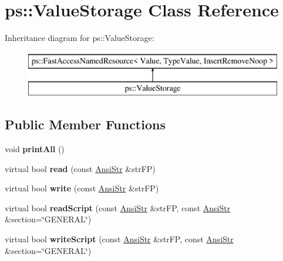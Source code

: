 \hypertarget{classps_1_1ValueStorage}{}\section{ps\+:\+:Value\+Storage Class Reference}
\label{classps_1_1ValueStorage}
Inheritance diagram for ps\+:\+:Value\+Storage\+:\begin{figure}[H]
\begin{center}
\leavevmode
\includegraphics[height=2.000000cm]{classps_1_1ValueStorage}
\end{center}
\end{figure}
\subsection*{Public Member Functions}
\begin{DoxyCompactItemize}
\item 
\hypertarget{classps_1_1ValueStorage_a683e7c7eaf6eb51811ba3b6dcbfeaad8}{}void {\bfseries print\+All} ()\label{classps_1_1ValueStorage_a683e7c7eaf6eb51811ba3b6dcbfeaad8}

\item 
\hypertarget{classps_1_1ValueStorage_ae1dc01f5d76d1d1f037e1ca330f3b8d8}{}virtual bool {\bfseries read} (const \hyperlink{classps_1_1base_1_1CAString}{Ansi\+Str} \&str\+F\+P)\label{classps_1_1ValueStorage_ae1dc01f5d76d1d1f037e1ca330f3b8d8}

\item 
\hypertarget{classps_1_1ValueStorage_a95a94b2b4bbed02ab26185ae1ba8f926}{}virtual bool {\bfseries write} (const \hyperlink{classps_1_1base_1_1CAString}{Ansi\+Str} \&str\+F\+P)\label{classps_1_1ValueStorage_a95a94b2b4bbed02ab26185ae1ba8f926}

\item 
\hypertarget{classps_1_1ValueStorage_a43014a4a189cda8ef9498edfe19993a8}{}virtual bool {\bfseries read\+Script} (const \hyperlink{classps_1_1base_1_1CAString}{Ansi\+Str} \&str\+F\+P, const \hyperlink{classps_1_1base_1_1CAString}{Ansi\+Str} \&section=\char`\"{}G\+E\+N\+E\+R\+A\+L\char`\"{})\label{classps_1_1ValueStorage_a43014a4a189cda8ef9498edfe19993a8}

\item 
\hypertarget{classps_1_1ValueStorage_a0d002ab47d51649919643afcc16b7f61}{}virtual bool {\bfseries write\+Script} (const \hyperlink{classps_1_1base_1_1CAString}{Ansi\+Str} \&str\+F\+P, const \hyperlink{classps_1_1base_1_1CAString}{Ansi\+Str} \&section=\char`\"{}G\+E\+N\+E\+R\+A\+L\char`\"{})\label{classps_1_1ValueStorage_a0d002ab47d51649919643afcc16b7f61}

\end{DoxyCompactItemize}
